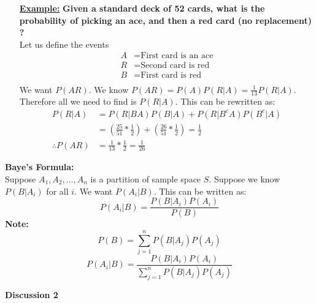 \documentclass[10pt]{article}
\begin{document}
\begin{flushleft}
   \begin{itemize}
\item[\textbf{\underline{Example:}}] \textbf{Given a standard deck of 52 cards,
    what is the probability of picking an ace, and then a red card (no
replacement) ?} \\
Let us define the events
        $$ \begin{aligned}
            A &= \text{First card is an ace} \\
            R &= \text{Second card is red}\\
            B &= \text{First card is red}\\
        \end{aligned} $$
        We want $P(AR)$. We know $P(AR) = P(A)P(R|A) = \frac{1}{13}P(R|A)$.
        Therefore all we need to find is $P(R|A)$. This can be rewritten as:
        $$ \begin{aligned}
            P(R|A) &= P(R|BA)P(B|A) + P(R|B^cA)P(B^c|A) \\
                   &= (\frac{25}{51} * \frac{1}{2}) + (\frac{26}{51} *
                   \frac{1}{2}) = \frac{1}{2} \\
            \therefore P(AR) &= \frac{1}{13} * \frac{1}{2} = \frac{1}{26}
        \end{aligned}$$

   \end{itemize}


   \textbf{Baye's Formula:} \\
   Suppose $A_1, A_2, ... , A_n$ is a partition of sample space $S$. Suppose we
   know $P(B|A_i)$ for all $i$. We want $P(A_i|B)$. This can be written as:
   $$ P(A_i|B) = \frac{P(B|A_i)P(A_i)}{P(B)} $$
   \textbf{Note:}
   $$ P(B) = \sum_{j = 1}^{n}P(B|A_j)P(A_j) $$
   $$ \boxed{
       P(A_i|B) = \frac{P(B|A_i)P(A_i)}{\sum_{j = 1}^{n}P(B|A_j)P(A_j)}
   }$$

   \newpage

\begin{center}
	\Large \textbf{Discussion 2}
\end{center}
\normalsize


\end{flushleft}
\end{document}
